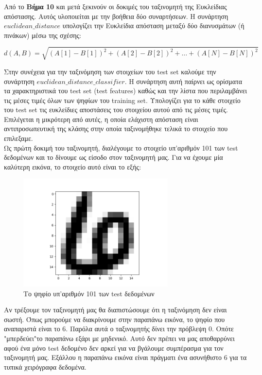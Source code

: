 \documentclass[11pt]{article} %
\begin{document}
Από το \textbf{Βήμα 10} και μετά ξεκινούν οι δοκιμές του ταξινομητή της Ευκλείδιας απόστασης. Αυτός υλοποιείται με την βοήθεια δύο συναρτήσεων. Η συνάρτηση $euclidean\_distance$ υπολογίζει την Ευκλείδια απόσταση μεταξύ δύο διανυσμάτων (ή πινάκων) μέσω της σχέσης:

\begin{equation}
\displaystyle d(A, B) = \sqrt{(A[1] -B[1]) ^ 2 + (A[2] - B[2]) ^ 2 + \dots + (A[N] - B[N]) ^ 2}
\end{equation}

Στην συνέχεια για την ταξινόμηση των στοιχείων του test set καλούμε την συνάρτηση $euclidean\_distance\_classifier$. Η συνάρτηση αυτή παίρνει ως ορίσματα τα χαρακτηριστικά του test set (test features) καθώς και την λίστα που περιλαμβάνει τις μέσες τιμές όλων των ψηφίων του training set. Υπολογίζει για το κάθε στοιχείο του test set τις ευκλείδιες αποστάσεις του στοιχείου αυτού από τις μέσες τιμές. Επιλέγεται η μικρότερη από αυτές, η οποία ελάχιστη απόσταση είναι αντιπροσωπευτική της κλάσης στην οποία ταξινομήθηκε τελικά το στοιχείο που επιλεξαμε.\\

Ως πρώτη δοκιμή του ταξινομητή, διαλέγουμε το στοιχείο υπ'αριθμόν 101 των test δεδομένων και το δίνουμε ως είσοδο στον ταξινομητή μας. Για να έχουμε μία καλύτερη εικόνα, το στοιχείο αυτό είναι το εξής:


\begin{figure}[H]
    \centering
    \includegraphics[width=0.7\textwidth]{plots/figure_101}
    \caption{Το ψηφίο υπ'αριθμόν 101 των test δεδομένων}
    \label{fig:101}
\end{figure}

Αν τρέξουμε τον ταξινομητή μας θα διαπιστώσουμε ότι η ταξινόμηση δεν είναι σωστή. Όπως μπορούμε να διακρίνουμε στην παραπάνω εικόνα, το ψηφίο που αναπαριστά είναι το $6$. Παρόλα αυτά ο ταξινομητής δίνει την πρόβλεψη $0$. Οπότε "μπερδεύει"το παραπάνω εξάρι με μηδενικό. Αυτό δεν πρέπει να μας αποθαρρύνει αφού ένα μόνο test δεδομένο δεν αρκεί για να βγάλουμε συμπέρασμα για τον ταξινομητή μας. Εξάλλου η παραπάνω εικόνα είναι πράγματι ένα ασυνήθιστο $6$ για τα τυπικά χειρόγραφα δεδομένα.\\
\end{document}
